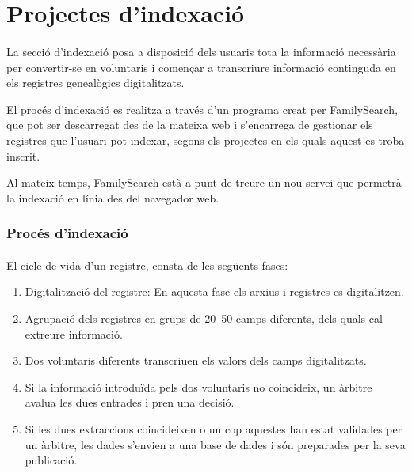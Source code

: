 \section{Projectes d'indexació}

    \paragraph{}
    La secció d’indexació posa a disposició dels usuaris tota la informació necessària per convertir-se en voluntaris i començar a transcriure informació continguda en els registres genealògics digitalitzats.

    El procés d’indexació es realitza a través d’un programa creat per FamilySearch, que pot ser descarregat des de la mateixa web i s’encarrega de gestionar els registres que l’usuari pot indexar, segons els projectes en els quals aquest es troba inscrit.

    Al mateix temps, FamilySearch està a punt de treure un nou servei que permetrà la indexació en línia des del navegador web.


    \subsubsection{Procés d'indexació}

        \paragraph{}
        El cicle de vida d’un registre, consta de les següents fases:

        \begin{enumerate}
            \item Digitalització del registre: En aquesta fase els arxius i registres es digitalitzen.
            \item Agrupació dels registres en grups de 20--50 camps diferents, dels quals cal extreure informació.
            \item Dos voluntaris diferents transcriuen els valors dels camps digitalitzats.
            \item Si la informació introduïda pels dos voluntaris no coincideix, un àrbitre avalua les dues entrades i pren una decisió.
            \item Si les dues extraccions coincideixen o un cop aquestes han estat validades per un àrbitre, les dades s’envien a una base de dades i són preparades per la seva publicació.
        \end{enumerate}

